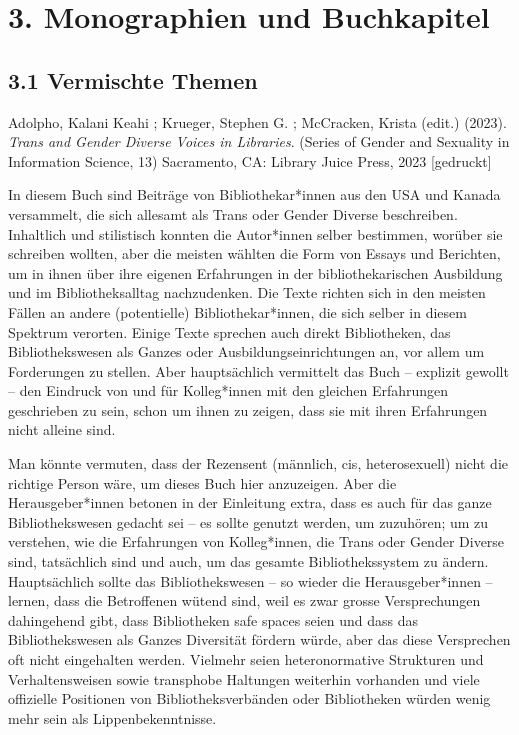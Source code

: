 \documentclass[a4paper,
fontsize=11pt,
oneside,
numbers=noperiodatend,
parskip=half-,
bibliography=totoc,
final
]{scrartcl}
\begin{document}
\hypertarget{monographien-und-buchkapitel}{%
\section{3. Monographien und
Buchkapitel}\label{monographien-und-buchkapitel}}

\hypertarget{vermischte-themen-1}{%
\subsection{3.1 Vermischte Themen}\label{vermischte-themen-1}}

Adolpho, Kalani Keahi ; Krueger, Stephen G. ; McCracken, Krista (edit.)
(2023). \emph{Trans and Gender Diverse Voices in Libraries}. (Series of
Gender and Sexuality in Information Science, 13) Sacramento, CA: Library
Juice Press, 2023 {[}gedruckt{]}

In diesem Buch sind Beiträge von Bibliothekar*innen aus den USA und
Kanada versammelt, die sich allesamt als Trans oder Gender Diverse
beschreiben. Inhaltlich und stilistisch konnten die Autor*innen selber
bestimmen, worüber sie schreiben wollten, aber die meisten wählten die
Form von Essays und Berichten, um in ihnen über ihre eigenen Erfahrungen
in der bibliothekarischen Ausbildung und im Bibliotheksalltag
nachzudenken. Die Texte richten sich in den meisten Fällen an andere
(potentielle) Bibliothekar*innen, die sich selber in diesem Spektrum
verorten. Einige Texte sprechen auch direkt Bibliotheken, das
Bibliothekswesen als Ganzes oder Ausbildungseinrichtungen an, vor allem
um Forderungen zu stellen. Aber hauptsächlich vermittelt das Buch – explizit gewollt – den Eindruck von und für Kolleg*innen mit den
gleichen Erfahrungen geschrieben zu sein, schon um ihnen zu zeigen, dass
sie mit ihren Erfahrungen nicht alleine sind.

Man könnte vermuten, dass der Rezensent (männlich, cis, heterosexuell)
nicht die richtige Person wäre, um dieses Buch hier anzuzeigen. Aber die
Herausgeber*innen betonen in der Einleitung extra, dass es auch für das
ganze Bibliothekswesen gedacht sei – es sollte genutzt werden, um
zuzuhören; um zu verstehen, wie die Erfahrungen von Kolleg*innen, die
Trans oder Gender Diverse sind, tatsächlich sind und auch, um das
gesamte Bibliothekssystem zu ändern. Hauptsächlich sollte das
Bibliothekswesen – so wieder die Herausgeber*innen – lernen, dass die
Betroffenen wütend sind, weil es zwar grosse Versprechungen dahingehend
gibt, dass Bibliotheken safe spaces seien und dass das Bibliothekswesen
als Ganzes Diversität fördern würde, aber das diese Versprechen oft
nicht eingehalten werden. Vielmehr seien heteronormative Strukturen und
Verhaltensweisen sowie transphobe Haltungen weiterhin vorhanden und
viele offizielle Positionen von Bibliotheksverbänden oder Bibliotheken
würden wenig mehr sein als Lippenbekenntnisse.
\end{document}
